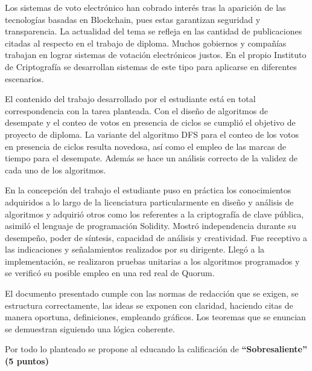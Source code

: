 \begin{opinion}
Los sistemas de voto electr\'onico han cobrado inter\'es tras la aparición de las tecnolog\'ias basadas en Blockchain, pues estas garantizan seguridad y transparencia. La actualidad del tema se refleja en las cantidad de publicaciones citadas al respecto en el trabajo de diploma. Muchos gobiernos y compañ\'ias trabajan en lograr sistemas de votaci\'on electr\'onicos justos. En el propio Instituto de Criptograf\'ia se desarrollan sistemas de este tipo para aplicarse en diferentes escenarios. 

El contenido del trabajo desarrollado por el estudiante está en total correspondencia con la tarea planteada. Con el diseño de algoritmos de desempate y el conteo de votos en presencia de ciclos se cumpli\'o el objetivo de proyecto de diploma. La variante del algoritmo DFS para el conteo de los votos en presencia de ciclos resulta novedosa, as\'i como el empleo de las marcas de tiempo para el desempate. Adem\'as se hace un an\'alisis correcto de la validez de cada uno de los algoritmos.

En la concepción del trabajo el estudiante puso en práctica los conocimientos adquiridos a lo largo de la licenciatura particularmente en diseño y an\'alisis de algoritmos y adquirió otros como los referentes a la criptografía de clave pública, asimiló el lenguaje de programación Solidity. Mostró independencia durante su desempeño, poder de síntesis, capacidad de análisis y creatividad. Fue receptivo a las indicaciones y señalamientos realizados por su dirigente.  Lleg\'o a la implementaci\'on, se realizaron pruebas unitarias a los algoritmos programados y se verificó su posible empleo en una red real de Quorum. 

El documento presentado  cumple con las normas de redacci\'on que se exigen, se estructura correctamente, las ideas se exponen con claridad, haciendo citas de manera oportuna, definiciones, empleando gr\'aficos. Los teoremas que se enuncian se demuestran siguiendo una l\'ogica coherente.


Por todo lo planteado se propone al educando la calificación de \textbf{ “Sobresaliente” (5 puntos)} 
\end{opinion}